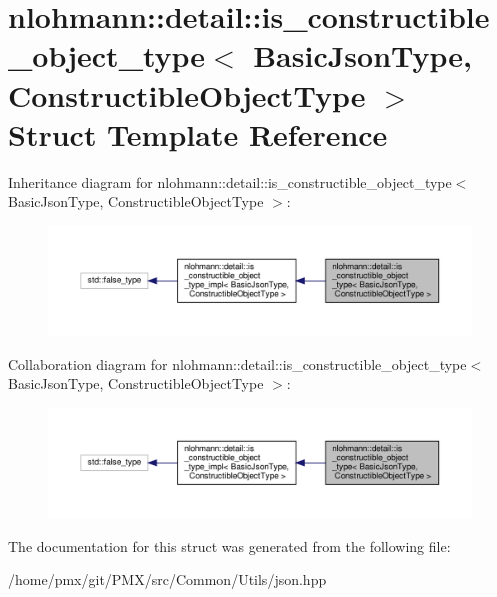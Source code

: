 \hypertarget{structnlohmann_1_1detail_1_1is__constructible__object__type}{}\section{nlohmann\+:\+:detail\+:\+:is\+\_\+constructible\+\_\+object\+\_\+type$<$ Basic\+Json\+Type, Constructible\+Object\+Type $>$ Struct Template Reference}
\label{structnlohmann_1_1detail_1_1is__constructible__object__type}


Inheritance diagram for nlohmann\+:\+:detail\+:\+:is\+\_\+constructible\+\_\+object\+\_\+type$<$ Basic\+Json\+Type, Constructible\+Object\+Type $>$\+:
\nopagebreak
\begin{figure}[H]
\begin{center}
\leavevmode
\includegraphics[width=350pt]{structnlohmann_1_1detail_1_1is__constructible__object__type__inherit__graph}
\end{center}
\end{figure}


Collaboration diagram for nlohmann\+:\+:detail\+:\+:is\+\_\+constructible\+\_\+object\+\_\+type$<$ Basic\+Json\+Type, Constructible\+Object\+Type $>$\+:
\nopagebreak
\begin{figure}[H]
\begin{center}
\leavevmode
\includegraphics[width=350pt]{structnlohmann_1_1detail_1_1is__constructible__object__type__coll__graph}
\end{center}
\end{figure}


The documentation for this struct was generated from the following file\+:\begin{DoxyCompactItemize}
\item 
/home/pmx/git/\+P\+M\+X/src/\+Common/\+Utils/json.\+hpp\end{DoxyCompactItemize}
